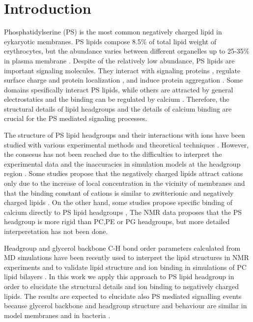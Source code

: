 \documentclass[aps,prl,superscriptaddress,twocolumn]{revtex4}
\begin{document}
\section{Introduction}
Phosphatidylserine (PS) is the most common negatively
charged lipid in eykaryotic membranes.
PS lipids compose 8.5\% of total lipid weight of erythrocytes,
but the abundance varies between different organelles up to
25-35\% in plasma membrane \cite{lemmon08,leventis10,li14}.
Despite of the relatively low abundance, PS lipids
are important signaling molecules. They interact with
signaling proteins \cite{leventis10}, regulate
surface charge and protein localization \cite{yeung08}, and
induce protein aggregation \cite{zhao04,gorbenko06}.
Some domains spesifically interact PS lipids,
while others are attracted by general electrostatics and the
binding can be regulated by calcium \cite{leventis10}.
Therefore, the structural details
of lipid headgroups and the details of calcium binding
are crucial for the PS mediated signaling processes.

The structure of PS lipid headgroups and their 
interactions with ions have been studied with
various experimental methods and theoretical techniques \cite{roux90,melcrova16,??}.
However, the consesus has not been reached 
due to the difficulties to interpret the experimental data \cite{??} and
the inaccuracies in simulation models at the
headgroup region \cite{botan15,catte16,ollila16}.
Some studies propose that the negatively charged lipids
attract cations only due to the increase of local concentration
in the vicinity of membranes and that the binding constant of cations is similar
to zwitterionic and negatively charged lipids \cite{seelig90,sinn06,??}.
On the other hand, some studies propose specific binding of calcium directly to PS lipid
headgroups \cite{vernier09,boettcher11,??},
The NMR data proposes that the PS headgroup is more rigid than PC,PE or PG
headgroups, but more detailed interperetation has not been done.



Headgroup and glycerol backbone C-H bond order parameters
calculated from MD simulations have been
recently used to interpret the lipid structures in NMR experiments
and to validate lipid structure and ion binding in simulations of
PC lipid bilayers \cite{botan15,catte16,ollila16,ferreira16}.
In this work we apply this approach to PS lipid headgroup
in order to elucidate the structural details and ion binding
to negatively charged lipids. The results are expected to elucidate
also PS mediated signalling events because 
glycerol backbone and headgroup structure and behaviour are similar
in model membranes and in bacteria \cite{gally81,scherer87,seelig90}.
\end{document}
